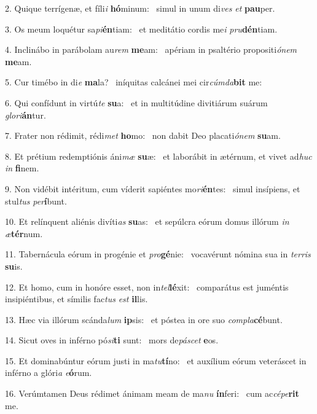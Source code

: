 2. Quique terrígenæ, et fíli\textit{i} \textbf{hó}minum: \ast\  simul in unum di\textit{ves} \textit{et} \textbf{pau}per.\

3. Os meum loquétur sa\textit{pi}\textbf{én}tiam: \ast\  et meditátio cordis me\textit{i} \textit{pru}\textbf{dén}tiam.\

4. Inclinábo in parábolam au\textit{rem} \textbf{me}am: \ast\  apériam in psaltério propositi\textit{ó}\textit{nem} \textbf{me}am.\

5. Cur timébo in di\textit{e} \textbf{ma}la? \ast\  iníquitas calcánei mei cir\textit{cúm}\textit{da}\textbf{bit} me:\

6. Qui confídunt in virtú\textit{te} \textbf{su}a: \ast\  et in multitúdine divitiárum suárum \textit{glo}\textit{ri}\textbf{án}tur.\

7. Frater non rédimit, rédi\textit{met} \textbf{ho}mo: \ast\  non dabit Deo placati\textit{ó}\textit{nem} \textbf{su}am.\

8. Et prétium redemptiónis áni\textit{mæ} \textbf{su}æ: \ast\  et laborábit in ætérnum, et vivet ad\textit{huc} \textit{in} \textbf{fi}nem.\

9. Non vidébit intéritum, cum víderit sapiéntes mo\textit{ri}\textbf{én}tes: \ast\  simul insípiens, et stul\textit{tus} \textit{per}\textbf{í}bunt.\

10. Et relínquent aliénis divíti\textit{as} \textbf{su}as: \ast\  et sepúlcra eórum domus illórum \textit{in} \textit{æ}\textbf{tér}num.\

11. Tabernácula eórum in progénie et \textit{pro}\textbf{gé}nie: \ast\  vocavérunt nómina sua in \textit{ter}\textit{ris} \textbf{su}is.\

12. Et homo, cum in honóre esset, non in\textit{tel}\textbf{lé}xit: \ast\  comparátus est juméntis insipiéntibus, et símilis fac\textit{tus} \textit{est} \textbf{il}lis.\

13. Hæc via illórum scánda\textit{lum} \textbf{ip}sis: \ast\  et póstea in ore suo \textit{com}\textit{pla}\textbf{cé}bunt.\

14. Sicut oves in inférno pó\textit{si}\textbf{ti} sunt: \ast\  mors de\textit{pá}\textit{scet} \textbf{e}os.\

15. Et dominabúntur eórum justi in ma\textit{tu}\textbf{tí}no: \ast\  et auxílium eórum veteráscet in inférno a glóri\textit{a} \textit{e}\textbf{ó}rum.\

16. Verúmtamen Deus rédimet ánimam meam de ma\textit{nu} \textbf{ín}feri: \ast\  cum ac\textit{cé}\textit{pe}\textbf{rit} me.\

